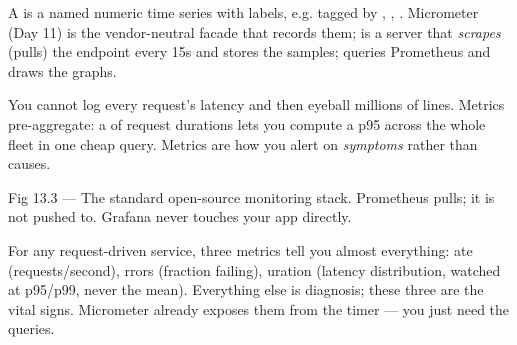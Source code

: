 
 A  is a named numeric time series with labels, e.g.  tagged by , , . Micrometer (Day 11) is the vendor-neutral facade that records them;  is a server that \emph{scrapes} (pulls) the  endpoint every 15s and stores the samples;  queries Prometheus and draws the graphs.

 You cannot log every request's latency and then eyeball millions of lines. Metrics pre-aggregate: a  of request durations lets you compute a p95 across the whole fleet in one cheap query. Metrics are how you alert on \emph{symptoms} rather than causes.

\begin{wbfigure}{Fig 13.3 --- The standard open-source monitoring stack. Prometheus pulls; it is not pushed to. Grafana never touches your app directly.}
\end{wbfigure}

 For any request-driven service, three metrics tell you almost everything: ate (requests/second), rrors (fraction failing), uration (latency distribution, watched at p95/p99, never the mean). Everything else is diagnosis; these three are the vital signs. Micrometer already exposes them from the  timer --- you just need the queries.


